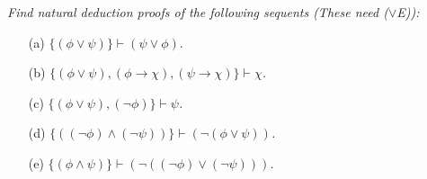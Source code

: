 \documentclass[12pt,a4paper]{article}
\theoremstyle{plain}
\begin{document}
\textit{Find natural deduction proofs of the following sequents (These need ($\vee$E)):}
%
\begin{enumerate}

\item[(a)] \textit{$\{ ( \phi \vee \psi) \} \vdash (\psi \vee \phi )$}.

\item[(b)] \textit{$\{ ( \phi \vee \psi ), ( \phi \rightarrow \chi ), (\psi \rightarrow \chi ) \} \vdash \chi$.}

\item[(c)] \textit{$\{ ( \phi \vee \psi ), ( \neg \phi) \} \vdash \psi$.}

\item[(d)] \textit{$\{ (( \neg \phi) \wedge ( \neg \psi )) \} \vdash ( \neg (\phi \vee \psi ))$.}

\item[(e)] \textit{$\{ (\phi \wedge \psi ) \} \vdash ( \neg (( \neg \phi) \vee (  \neg \psi )))$.}

\end{enumerate}
\end{document}
